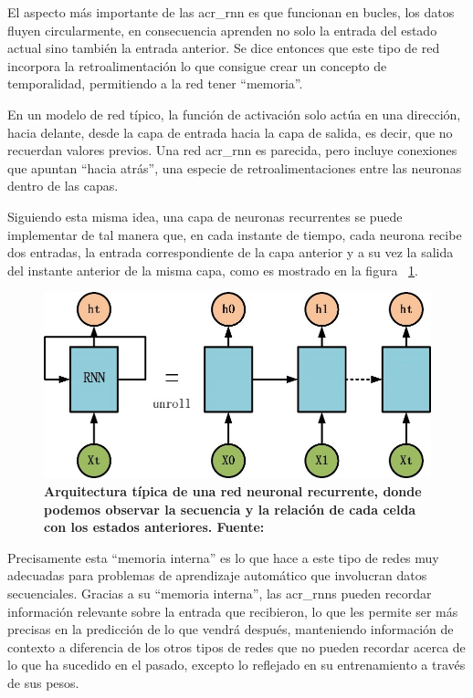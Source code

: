 El aspecto más importante de las \acrshort{acr_rnn} es que funcionan en bucles, los datos fluyen circularmente, en consecuencia aprenden no solo la entrada del estado actual sino también la entrada anterior. Se dice entonces que este tipo de red incorpora la retroalimentación lo que consigue crear un concepto de temporalidad, permitiendo a la red tener ``memoria''.

En un modelo de red típico, la función de activación solo actúa en una dirección, hacia delante, desde la capa de entrada hacia la capa de salida, es decir, que no recuerdan valores previos. Una red \acrshort{acr_rnn} es parecida, pero incluye conexiones que apuntan ``hacia atrás'', una especie de retroalimentaciones entre las neuronas dentro de las capas.

Siguiendo esta misma idea, una capa de neuronas recurrentes se puede implementar de tal manera que, en cada instante de tiempo, cada neurona recibe dos entradas, la entrada correspondiente de la capa anterior y a su vez la salida del instante anterior de la misma capa, como es mostrado en la figura ~\ref{fig-intro-arq-rnn}.

\begin{figure}[ht!]
    \centering
    \includegraphics[scale=0.3]{figuras/intro-arq-rnn.png}
    \caption[Arquitectura de red neuronal recurrente (RNN)]{\textbf{Arquitectura típica de una red neuronal recurrente, donde podemos observar la secuencia y la relación de cada celda con los estados anteriores. Fuente: \citep{articleFang2020LSTM}}}
    \label{fig-intro-arq-rnn}
\end{figure}

Precisamente esta ``memoria interna'' es lo que hace a este tipo de redes muy adecuadas para problemas de aprendizaje automático que involucran datos secuenciales. Gracias a su ``memoria interna'', las \acrshort{acr_rnn}s pueden recordar información relevante sobre la entrada que recibieron, lo que les permite ser más precisas en la predicción de lo que vendrá después, manteniendo información de contexto a diferencia de los otros tipos de redes que no pueden recordar acerca de lo que ha sucedido en el pasado, excepto lo reflejado en su entrenamiento a través de sus pesos.

